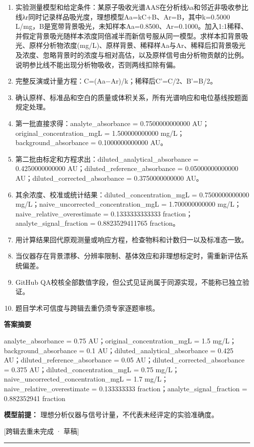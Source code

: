 \documentclass[UTF8,11pt,a4paper]{ctexart}
\begin{document}
\begin{enumerate}
\item 实验测量模型和给定条件：某原子吸收光谱AAS在分析线λa和邻近非吸收参比线λr同时记录样品吸光度，理想模型Aa=kC+B、Ar=B，其中k=0.5000 L/mg，B是宽带背景吸光，未知样本Aa=0.8500、Ar=0.1000。加入1:1稀释、并假定背景吸光随样本浓度同倍减半而新信号服从同一模型。求样本扣背景吸光、原样分析物浓度(mg/L)、原样背景、稀释样Aa与Ar、稀释后扣背景吸光及浓度、忽略背景时的浓度与相对高估，以及原样信号由分析物贡献的比例。说明参比线不能出现分析物吸收，否则两线扣除有偏。
\item 完整反演或计量方程：C=(Aa−Ar)/k；稀释后C'=C/2、B'=B/2。
\item 确认原样、标准品和空白的质量或体积关系，所有光谱响应和电位基线按题面规定处理。
\item 第一批直接求得：analyte\_absorbance = 0.7500000000000 AU；original\_concentration\_mgL = 1.500000000000 mg/L；background\_absorbance = 0.1000000000000 AU。
\item 第二批由标定和方程求出：diluted\_analytical\_absorbance = 0.4250000000000 AU；diluted\_reference\_absorbance = 0.05000000000000 AU；diluted\_corrected\_absorbance = 0.3750000000000 AU。
\item 其余浓度、校准或统计结果：diluted\_concentration\_mgL = 0.7500000000000 mg/L；naive\_uncorrected\_concentration\_mgL = 1.700000000000 mg/L；naive\_relative\_overestimate = 0.1333333333333 fraction；analyte\_signal\_fraction = 0.8823529411765 fraction。
\item 用计算结果回代原观测量或响应方程，检查物料和计数归一以及标准态一致。
\item 当仪器存在背景漂移、分辨率限制、基体效应和非理想标定时，需重新评估系统偏差。
\item GitHub QA校核全部数值字段，但公式见证尚属于同源实现，不能称已独立验证。
\item 题目学术可信度与跨辑去重仍须专家逐题审核。
\end{enumerate}
\noindent\textbf{答案摘要}\par
analyte\_absorbance = 0.75 AU；original\_concentration\_mgL = 1.5 mg/L；background\_absorbance = 0.1 AU；diluted\_analytical\_absorbance = 0.425 AU；diluted\_reference\_absorbance = 0.05 AU；diluted\_corrected\_absorbance = 0.375 AU；diluted\_concentration\_mgL = 0.75 mg/L；naive\_uncorrected\_concentration\_mgL = 1.7 mg/L；naive\_relative\_overestimate = 0.133333333 fraction；analyte\_signal\_fraction = 0.882352941 fraction\par
\noindent\textbf{模型前提：}
理想分析仪器与信号计量，不代表未经评定的实验准确度。\par
\noindent\textcolor{red!65!black}{[跨辑去重未完成 · 草稿]} \par
\medskip\hrule\medskip
{}
\end{document}
